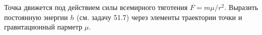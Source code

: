 Точка движется под действием силы всемирного тяготения $F=m\mu/r^2$. Выразить постоянную энергии $h$ (см. задачу 51.7)
через элементы траектории точки и гравитационный парметр $\mu$.
